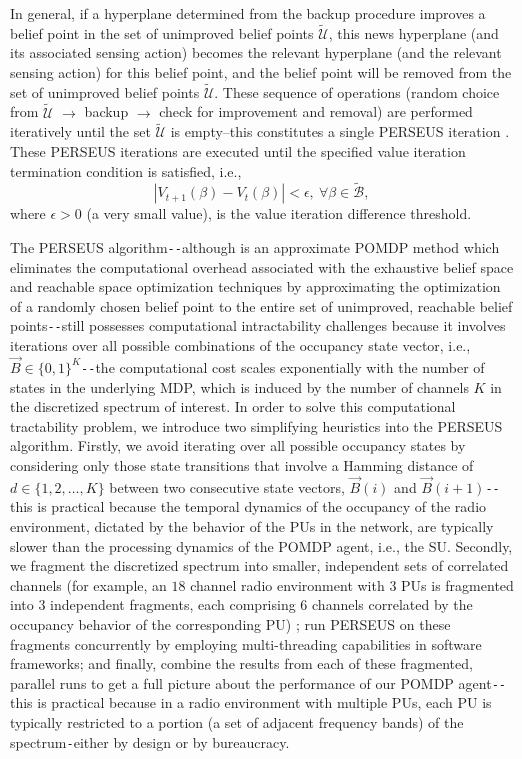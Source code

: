 In general, if a hyperplane determined from the backup procedure improves a belief point in the set of unimproved belief points $\tilde{\mathcal{U}}$, this news hyperplane (and its associated sensing action) becomes the relevant hyperplane (and the relevant sensing action) for this belief point, and the belief point will be removed from the set of unimproved belief points $\tilde{\mathcal{U}}$. These sequence of operations (random choice from $\tilde{\mathcal{U}}$ ${\longrightarrow}$ backup ${\longrightarrow}$ check for improvement and removal) are performed iteratively until the set $\tilde{\mathcal{U}}$ is empty--this constitutes a single PERSEUS iteration \cite{WCL:paper}. These PERSEUS iterations are executed until the specified value iteration termination condition is satisfied, i.e.,
\begin{equation}\label{29}
    |V_{t+1}(\beta)-V_{t}(\beta)|<\epsilon,\ \forall \beta \in \tilde{\mathcal{B}},
\end{equation}
where $\epsilon{>}0$ (a very small value), is the value iteration difference threshold.

The PERSEUS algorithm\texttt{-{}-}although is an approximate POMDP method which eliminates the computational overhead associated with the exhaustive belief space and reachable space optimization techniques \cite{PUOccupancy:18,PUOccupancy:17} by approximating the optimization of a randomly chosen belief point to the entire set of unimproved, reachable belief points\texttt{-{}-}still possesses computational intractability challenges because it involves iterations over all possible combinations of the occupancy state vector, i.e., $\vec{B}{\in}\{0,1\}^{K}$\texttt{-{}-}the computational cost scales exponentially with the number of states in the underlying MDP, which is induced by the number of channels $K$ in the discretized spectrum of interest. In order to solve this computational tractability problem, we introduce two simplifying heuristics into the PERSEUS algorithm. Firstly, we avoid iterating over all possible occupancy states by considering only those state transitions that involve a Hamming distance of $d{\in}\{1,2,\dots,K\}$ between two consecutive state vectors, $\vec{B}(i)$ and $\vec{B}(i+1)$\texttt{-{}-}this is practical because the temporal dynamics of the occupancy of the radio environment, dictated by the behavior of the PUs in the network, are typically slower than the processing dynamics of the POMDP agent, i.e., the SU. Secondly, we fragment the discretized spectrum into smaller, independent sets of correlated channels (for example, an $18$ channel radio environment with $3$ PUs is fragmented into $3$ independent fragments, each comprising $6$ channels correlated by the occupancy behavior of the corresponding PU) \cite{WCL:paper}; run PERSEUS on these fragments concurrently by employing multi-threading capabilities in software frameworks; and finally, combine the results from each of these fragmented, parallel runs to get a full picture about the performance of our POMDP agent\texttt{-{}-}this is practical because in a radio environment with multiple PUs, each PU is typically restricted to a portion (a set of adjacent frequency bands) of the spectrum\texttt{-}either by design or by bureaucracy.
